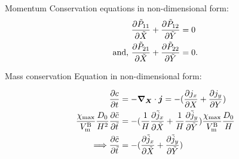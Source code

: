 Momentum Conservation equations in non-dimensional form:
\begin{subequations}
\begin{align}
    \pdiff{\tP{11}}{\tX} + \pdiff{\tP{12}}{\tY} &= 0 \\
    \text{and, }   \pdiff{\tP{21}}{\tX} +  \pdiff{\tP{22}}{\tY} &= 0.
\end{align}
\end{subequations}



Mass conservation Equation in non-dimensional form:

\begin{align}
    \pdiff{c}{t} &= - \nablaX \cdot \bm{j} = -(\pdiff{j_x}{X} + \pdiff{j_y}{ Y}) \nonumber \\ 
    \cmax \fc{D_0}{H^2} \pdiff{{\td{c}}}{\tt}  &= -(\fc{1}{H}\pdiff{ \td{j}_x}{\tX} + \fc{1}{H}\pdiff{ \td{j}_y}{\tY})\cmax \fc{D_0}{H} \nonumber \\ 
    \Longrightarrow  \pdiff{{\tc}}{\tt}  &= - (\pdiff{ \td{j}_x}{\tX} +  \pdiff{ \td{j}_y}{\tY}) 
\end{align}
